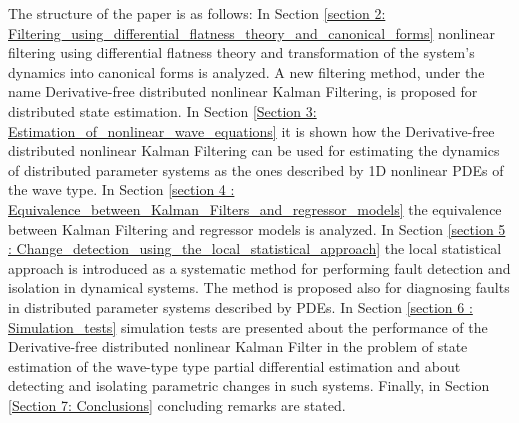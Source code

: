 \documentclass[journal]{IEEEtran}
\begin{document}
\noindent The structure of the paper is as follows: In Section \ref{section 2: Filtering_using_differential_flatness_theory_and_canonical_forms} nonlinear filtering using differential flatness theory and transformation of the system's dynamics into canonical forms is analyzed. A new filtering method, under the name Derivative-free distributed nonlinear Kalman Filtering, is proposed for distributed state estimation. In Section \ref{Section 3: Estimation_of_nonlinear_wave_equations} it is shown how the Derivative-free distributed nonlinear Kalman Filtering can be used for estimating the dynamics of distributed parameter systems as the ones described by 1D nonlinear PDEs of the wave type. In Section \ref{section 4 : Equivalence_between_Kalman_Filters_and_regressor_models} the equivalence between Kalman Filtering and regressor models is analyzed. In Section \ref{section 5 : Change_detection_using_the_local_statistical_approach} the local statistical approach is introduced as a systematic method for performing fault detection and isolation in dynamical systems. The method is proposed also for diagnosing faults in distributed parameter systems described by PDEs. In Section  \ref{section 6 : Simulation_tests} simulation tests are presented about the performance of the Derivative-free distributed nonlinear Kalman Filter in the problem of state estimation of the wave-type type partial differential estimation and about detecting and isolating parametric changes in such systems. Finally, in Section \ref{Section 7: Conclusions} concluding remarks are stated.
\end{document}
